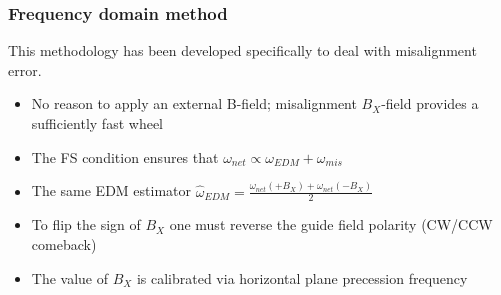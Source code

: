 \documentclass{beamer}
\newcommand{\w}{\omega}
\begin{document}
\begin{frame}\frametitle{Frequency domain method}
  This methodology has been developed specifically to deal with misalignment error.
  \begin{itemize}
  \item No reason to apply an external B-field; misalignment $B_X$-field provides a sufficiently fast wheel
  \item The FS condition ensures that $\w_{net} \propto \w_{EDM} + \w_{mis}$
  \item The same EDM estimator $\hat\w_{EDM} = \frac{\w_{net}(+B_X) + \w_{net}(-B_X)}{2}$
  \item To flip the sign of $B_X$ one must reverse the guide field polarity (CW/CCW comeback)
  \item The value of $B_X$ is calibrated via horizontal plane precession frequency
  \end{itemize}
\end{frame}
\end{document}
